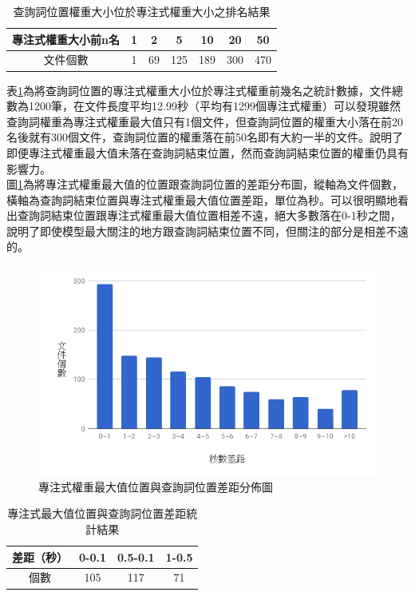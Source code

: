\begin{itemize}
\begin{table}[hb]
	 \centering
	 \caption{查詢詞位置權重大小位於專注式權重大小之排名結果}
	 \label{table:ch4_attpos}
	 \begin{tabular}{|c|c|c|c|c|c|c|}
		 \hline
		 專注式權重大小前n名&1 & 2 & 5 & 10 & 20 &50\\
		 \hline
		 文件個數&1 & 69 &125 &189 &300 &470\\
		 \hline
	   \end{tabular}
\end{table}
表\ref{table:ch4_attpos}為將查詢詞位置的專注式權重大小位於專注式權重前幾名之統計數據，文件總數為1200筆，在文件長度平均12.99秒（平均有1299個專注式權重）可以發現雖然查詢詞權重為專注式權重最大值只有1個文件，但查詢詞位置的權重大小落在前20名後就有300個文件，查詢詞位置的權重落在前50名即有大約一半的文件。說明了即便專注式權重最大值未落在查詢詞結束位置，然而查詢詞結束位置的權重仍具有影響力。
\\

圖\ref{fig:ch4_attdis}為將專注式權重最大值的位置跟查詢詞位置的差距分布圖，縱軸為文件個數，橫軸為查詢詞結束位置與專注式權重最大值位置差距，單位為秒。可以很明顯地看出查詢詞結束位置跟專注式權重最大值位置相差不遠，絕大多數落在0-1秒之間，說明了即使模型最大關注的地方跟查詢詞結束位置不同，但關注的部分是相差不遠的。
\begin{figure}
\centering
\includegraphics[scale=0.5]{images/ch4_attdis.png} 
\caption{專注式權重最大值位置與查詢詞位置差距分佈圖}
\label{fig:ch4_attdis}
\end{figure}

\begin{table}[hb]
	 \centering
	 \caption{專注式最大值位置與查詢詞位置差距統計結果}
	 \label{table:ch4_attdis0-1}
	 \begin{tabular}{|c|c|c|c|}
		 \hline
		 差距（秒）& 0-0.1 & 0.5-0.1 & 1-0.5 \\
		 \hline
		 個數 & 105   & 117	  & 71 \\
		 \hline
	   \end{tabular}
\end{table}


\end{itemize}
